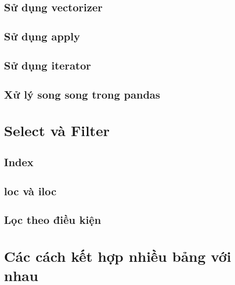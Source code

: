 \documentclass[
]{book}
\begin{document}
\hypertarget{sux1eed-dux1ee5ng-vectorizer}{%
\section{Sử dụng vectorizer}\label{sux1eed-dux1ee5ng-vectorizer}}

\hypertarget{sux1eed-dux1ee5ng-apply}{%
\section{Sử dụng apply}\label{sux1eed-dux1ee5ng-apply}}

\hypertarget{sux1eed-dux1ee5ng-iterator}{%
\section{Sử dụng iterator}\label{sux1eed-dux1ee5ng-iterator}}

\hypertarget{xux1eed-luxfd-song-song-trong-pandas}{%
\section{Xử lý song song trong pandas}\label{xux1eed-luxfd-song-song-trong-pandas}}

\hypertarget{select-vuxe0-filter}{%
\chapter{Select và Filter}\label{select-vuxe0-filter}}

\hypertarget{index}{%
\section{Index}\label{index}}

\hypertarget{loc-vuxe0-iloc}{%
\section{loc và iloc}\label{loc-vuxe0-iloc}}

\hypertarget{lux1ecdc-theo-ux111iux1ec1u-kiux1ec7n}{%
\section{Lọc theo điều kiện}\label{lux1ecdc-theo-ux111iux1ec1u-kiux1ec7n}}

\hypertarget{cuxe1c-cuxe1ch-kux1ebft-hux1ee3p-nhiux1ec1u-bux1ea3ng-vux1edbi-nhau}{%
\chapter{Các cách kết hợp nhiều bảng với nhau}\label{cuxe1c-cuxe1ch-kux1ebft-hux1ee3p-nhiux1ec1u-bux1ea3ng-vux1edbi-nhau}}
\end{document}
